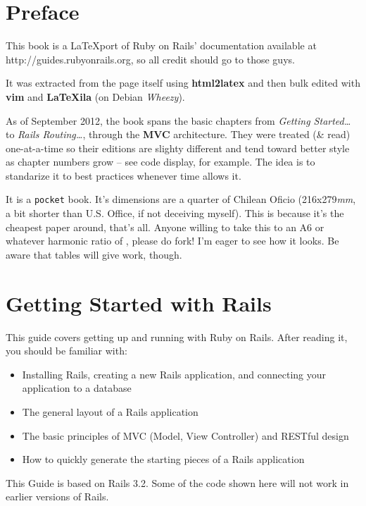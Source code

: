 \documentclass[10pt]{book}
\begin{document}
\footnotesize

\chapter*{Preface}
This book is a \LaTeX port of Ruby on Rails' documentation available at http://guides.rubyonrails.org, so all credit should go to those guys.

It was extracted from the page itself using \textbf{html2latex} and then bulk edited with \textbf{vim} and \textbf{LaTeXila} (on Debian \textit{Wheezy}).

As of September 2012, the book spans the basic chapters from \textit{Getting Started\ldots} to \textit{Rails Routing\ldots}, through the \textbf{MVC} architecture.
They were treated (\& read) one-at-a-time so their editions are slighty different and tend toward better style as chapter numbers grow -- see code display, for example. The idea is to standarize it to best practices whenever time allows it.

It is a \texttt{pocket} book. It's dimensions are a quarter of Chilean Oficio (216x279\emph{mm}, a bit shorter than U.S. Office, if not deceiving myself). This is because it's the cheapest paper around, that's all. Anyone willing to take this to an A6 or whatever harmonic ratio of , please do fork! I'm eager to see how it looks. Be aware that tables will give work, though.

\chapter{Getting Started with Rails}

This guide covers getting up and running with Ruby on Rails. After reading it, you should be familiar with:
\begin{itemize}
	\item Installing Rails, creating a new Rails application, and connecting your application to a database
	\item The general layout of a Rails application
	\item The basic principles of MVC (Model, View Controller) and RESTful design
	\item How to quickly generate the starting pieces of a Rails application
\end{itemize}


This Guide is based on Rails 3.2. Some of the code shown here will not work in earlier versions of Rails.
\end{document}
